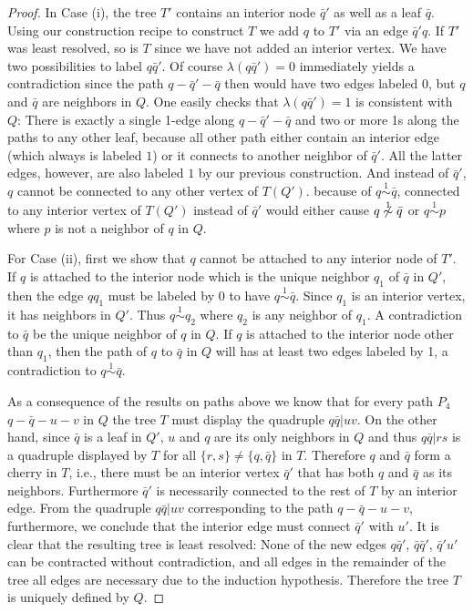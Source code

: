 \documentclass[smallextended]{svjour3}
\newcommand{\Rl}{\mathrel{\overset{1}{\sim}}}
\begin{document}
\begin{proof}
  In Case (i), the tree $T'$ contains an interior node $\bar q'$ as well as
  a leaf $\bar q$.  Using our construction recipe to construct $T$ we add
  $q$ to $T'$ via an edge $\bar q' q$. If $T'$ was least resolved, so is
  $T$ since we have not added an interior vertex.  We have two
  possibilities to label $q\bar q'$.  Of course $\lambda(q\bar q')=0$
  immediately yields a contradiction since the path $q-\bar q'-\bar q$ then
  would have two edges labeled $0$, but $q$ and $\bar q$ are neighbors in
  $Q$. One easily checks that $\lambda(q\bar q')=1$ is consistent with $Q$:
  There is exactly a single 1-edge along $q-\bar q'-\bar q$ and two or more
  1s along the paths to any other leaf, because all other path either
  contain an interior edge (which always is labeled $1$) or it connects to
  another neighbor of $\bar q'$. All the latter edges, however, are also
  labeled $1$ by our previous construction.  And instead of $\bar q'$, $q$
  cannot be connected to any other vertex of $T(Q')$.  because of $q\Rl
  \bar q$, connected to any interior vertex of $T(Q')$ instead of $\bar q'$
  would either cause $q\not \Rl \bar q$ or $q\Rl p$ where $p$ is not a
  neighbor of $q$ in $Q$.
 
  For Case (ii), first we show that $q$ cannot be attached to any interior
  node of $T'$. If $q$ is attached to the interior node which is the unique
  neighbor $q_1$ of $\bar q$ in $Q'$, then the edge $qq_1$ must be labeled
  by 0 to have $q\Rl \bar q$. Since $q_1$ is an interior vertex, it has
  neighbors in $Q'$. Thus $q\Rl q_2$ where $q_2$ is any neighbor of
  $q_1$. A contradiction to $\bar q$ be the unique neighbor of $q$ in
  $Q$. If $q$ is attached to the interior node other than $q_1$, then the
  path of $q$ to $\bar q$ in $Q$ will has at least two edges labeled by 1,
  a contradiction to $q \Rl \bar q$.
  
  As a consequence of the results on paths above we know that for every
  path $P_4$ $q-\bar q-u-v$ in $Q$ the tree $T$ must display the quadruple
  $q\bar q|uv$. On the other hand, since $\bar q$ is a leaf in $Q'$, $u$
  and $q$ are its only neighbors in $Q$ and thus $q\bar q|rs$ is a
  quadruple displayed by $T$ for all $\{r,s\}\ne\{q,\bar q\}$ in
  $T$. Therefore $q$ and $\bar q$ form a cherry in $T$, i.e., there must be
  an interior vertex $\bar q'$ that has both $q$ and $\bar q$ as its
  neighbors. Furthermore $\bar q'$ is necessarily connected to the rest of
  $T$ by an interior edge. From the quadruple $q\bar q|uv$ corresponding to
  the path $q-\bar q-u-v$, furthermore, we conclude that the interior edge
  must connect $\bar q'$ with $u'$. It is clear that the resulting tree is
  least resolved: None of the new edges $q\bar q'$, $\bar q\bar q'$, $\bar
  q'u'$ can be contracted without contradiction, and all edges in the
  remainder of the tree all edges are necessary due to the induction
  hypothesis. Therefore the tree $T$ is uniquely defined by $Q$.


\end{proof}
\end{document}
